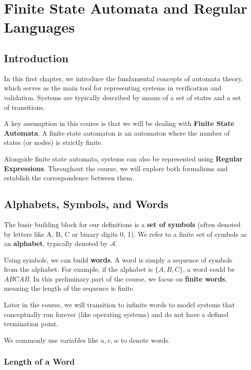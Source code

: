 \chapter{Finite State Automata and Regular Languages}

\section{Introduction}

In this first chapter, we introduce the fundamental concepts of automata theory, which serves as the main tool for representing systems in verification and validation. Systems are typically described by means of a set of states and a set of transitions. 

A key assumption in this course is that we will be dealing with \textbf{Finite State Automata}. A finite state automaton is an automaton where the number of states (or nodes) is strictly finite. 

Alongside finite state automata, systems can also be represented using \textbf{Regular Expressions}. Throughout the course, we will explore both formalisms and establish the correspondence between them.

\section{Alphabets, Symbols, and Words}

The basic building block for our definitions is a \textbf{set of symbols} (often denoted by letters like A, B, C or binary digits 0, 1). We refer to a finite set of symbols as an \textbf{alphabet}, typically denoted by $\mathcal{A}$.

Using symbols, we can build \textbf{words}. A word is simply a sequence of symbols from the alphabet. For example, if the alphabet is $\{A, B, C\}$, a word could be $ABCAB$. In this preliminary part of the course, we focus on \textbf{finite words}, meaning the length of the sequence is finite. 

\begin{note}
Later in the course, we will transition to infinite words to model systems that conceptually run forever (like operating systems) and do not have a defined termination point.
\end{note}

We commonly use variables like $u, v, w$ to denote words.

\subsection{Length of a Word}

